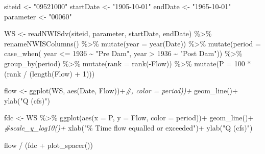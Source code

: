 \documentclass[
]{book}
\newenvironment{Shaded}{\begin{snugshade}}{\end{snugshade}}
\newcommand{\AttributeTok}[1]{\textcolor[rgb]{0.77,0.63,0.00}{#1}}
\newcommand{\CommentTok}[1]{\textcolor[rgb]{0.56,0.35,0.01}{\textit{#1}}}
\newcommand{\DecValTok}[1]{\textcolor[rgb]{0.00,0.00,0.81}{#1}}
\newcommand{\FunctionTok}[1]{\textcolor[rgb]{0.00,0.00,0.00}{#1}}
\newcommand{\NormalTok}[1]{#1}
\newcommand{\OtherTok}[1]{\textcolor[rgb]{0.56,0.35,0.01}{#1}}
\newcommand{\SpecialCharTok}[1]{\textcolor[rgb]{0.00,0.00,0.00}{#1}}
\newcommand{\StringTok}[1]{\textcolor[rgb]{0.31,0.60,0.02}{#1}}
\begin{document}
\begin{Shaded}
\begin{Highlighting}[]
\NormalTok{siteid }\OtherTok{\textless{}{-}} \StringTok{"09521000"}
\NormalTok{startDate }\OtherTok{\textless{}{-}} \StringTok{"1905{-}10{-}01"}
\NormalTok{endDate }\OtherTok{\textless{}{-}} \StringTok{"1965{-}10{-}01"}
\NormalTok{parameter }\OtherTok{\textless{}{-}} \StringTok{"00060"}

\NormalTok{WS }\OtherTok{\textless{}{-}} \FunctionTok{readNWISdv}\NormalTok{(siteid, parameter, startDate, endDate) }\SpecialCharTok{\%\textgreater{}\%} 
  \FunctionTok{renameNWISColumns}\NormalTok{() }\SpecialCharTok{\%\textgreater{}\%}
  \FunctionTok{mutate}\NormalTok{(}\AttributeTok{year =} \FunctionTok{year}\NormalTok{(Date)) }\SpecialCharTok{\%\textgreater{}\%}
  \FunctionTok{mutate}\NormalTok{(}\AttributeTok{period =} \FunctionTok{case\_when}\NormalTok{( year }\SpecialCharTok{\textless{}=} \DecValTok{1936} \SpecialCharTok{\textasciitilde{}} \StringTok{"Pre Dam"}\NormalTok{,}
\NormalTok{                             year }\SpecialCharTok{\textgreater{}} \DecValTok{1936}  \SpecialCharTok{\textasciitilde{}} \StringTok{"Post Dam"}\NormalTok{)) }\SpecialCharTok{\%\textgreater{}\%}
  \FunctionTok{group\_by}\NormalTok{(period) }\SpecialCharTok{\%\textgreater{}\%}
  \FunctionTok{mutate}\NormalTok{(}\AttributeTok{rank =} \FunctionTok{rank}\NormalTok{(}\SpecialCharTok{{-}}\NormalTok{Flow)) }\SpecialCharTok{\%\textgreater{}\%} 
  \FunctionTok{mutate}\NormalTok{(}\AttributeTok{P =} \DecValTok{100} \SpecialCharTok{*}\NormalTok{ (rank }\SpecialCharTok{/}\NormalTok{ (}\FunctionTok{length}\NormalTok{(Flow) }\SpecialCharTok{+} \DecValTok{1}\NormalTok{)))}

\NormalTok{flow }\OtherTok{\textless{}{-}} \FunctionTok{ggplot}\NormalTok{(WS, }\FunctionTok{aes}\NormalTok{(Date, Flow))}\SpecialCharTok{+}\CommentTok{\#, color = period))+}
  \FunctionTok{geom\_line}\NormalTok{()}\SpecialCharTok{+}
  \FunctionTok{ylab}\NormalTok{(}\StringTok{"Q (cfs)"}\NormalTok{)}

\NormalTok{fdc }\OtherTok{\textless{}{-}}\NormalTok{ WS }\SpecialCharTok{\%\textgreater{}\%} \FunctionTok{ggplot}\NormalTok{(}\FunctionTok{aes}\NormalTok{(}\AttributeTok{x =}\NormalTok{ P, }\AttributeTok{y =}\NormalTok{ Flow, }\AttributeTok{color =}\NormalTok{ period))}\SpecialCharTok{+}
  \FunctionTok{geom\_line}\NormalTok{()}\SpecialCharTok{+}
  \CommentTok{\#scale\_y\_log10()+}
  \FunctionTok{xlab}\NormalTok{(}\StringTok{"\% Time flow equalled or exceeded"}\NormalTok{)}\SpecialCharTok{+}
  \FunctionTok{ylab}\NormalTok{(}\StringTok{"Q (cfs)"}\NormalTok{)}

\NormalTok{flow }\SpecialCharTok{/}\NormalTok{ (fdc }\SpecialCharTok{+} \FunctionTok{plot\_spacer}\NormalTok{())}
\end{Highlighting}
\end{Shaded}
\end{document}
